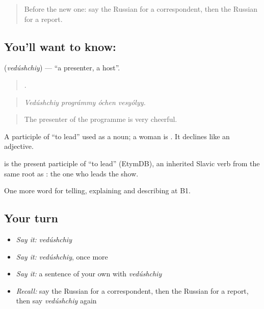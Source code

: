 \label{lesson:RU-C281-vedushchiy}



\begin{quote}
Before the new one: say the Russian for a correspondent, then the Russian for a report.
\end{quote}

\subsection*{You'll want to know: }
\textbf{} (\emph{vedúshchiy}) — \textquotedblleft{}a presenter, a host\textquotedblright{}.

\begin{quote}
   .
\end{quote}

\begin{quote}
\emph{Vedúshchiy prográmmy óchen vesyólyy.}
\end{quote}

\begin{quote}
The presenter of the programme is very cheerful.
\end{quote}

A participle of \emph{} \textquotedblleft{}to lead\textquotedblright{} used as a noun; a woman is \emph{}. It declines like an adjective.

\begin{cousinweb}
\emph{} is the present participle of \emph{} \textquotedblleft{}to lead\textquotedblright{} (EtymDB), an inherited Slavic verb from the same root as \emph{}: the one who leads the show.
\end{cousinweb}

\begin{grammarlens}[title={What you've built}]
One more word for telling, explaining and describing at B1.
\end{grammarlens}

\subsection*{Your turn}
\begin{itemize}
\raggedright
  \item \emph{Say it:} \emph{vedúshchiy}
  \item \emph{Say it:} \emph{vedúshchiy}, once more
  \item \emph{Say it:} a sentence of your own with \emph{vedúshchiy}
  \item \emph{Recall:} say the Russian for a correspondent, then the Russian for a report, then say \emph{vedúshchiy} again
\end{itemize}

